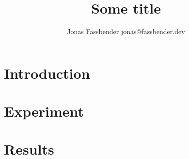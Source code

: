 \documentclass[twoside,11pt]{article}
\title{Some title}
\author{\name Jonas Fassbender
        \email jonas@fassbender.dev}
\begin{document}
\maketitle

\begin{abstract}
\end{abstract}

\begin{keywords}
\end{keywords}

\section{Introduction}

\section{Experiment}

\section{Results}


\begin{center}



\end{center}
\end{document}
